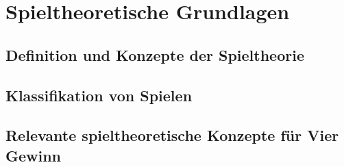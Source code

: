 \chapter{Spieltheoretische Grundlagen}

\section{Definition und Konzepte der Spieltheorie}
\section{Klassifikation von Spielen}
\section{Relevante spieltheoretische Konzepte für Vier Gewinn}